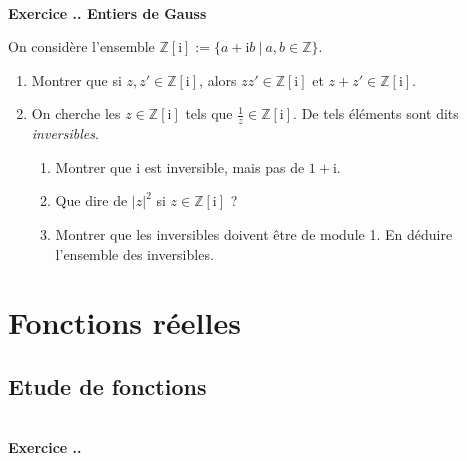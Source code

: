 \documentclass{article}
\newcommand{\mb}[1]{\mathbb{#1}}
\newcounter{exo}
\newcommand{\exercice}[1][\null]{\textbf{\\ Exercice \thesection.\theexo. #1} \addtocounter{exo}{1}}
\begin{document}
\exercice[Entiers de Gauss]

On considère l'ensemble $\mb{Z}[\text{i}] := \{a + \text{i}b~|~a, b \in \mb{Z}\}$.

\begin{enumerate}

\item Montrer que si $z, z' \in \mb{Z}[\text{i}]$, alors $zz' \in \mb{Z}[\text{i}]$ et $z+z' \in \mb{Z}[\text{i}]$.

\item On cherche les $z \in \mb{Z}[\text{i}] $ tels que $ \frac{1}{z} \in \mb{Z}[\text{i}]$. De tels éléments sont dits \emph{inversibles}.

\begin{enumerate}

\item Montrer que $\text{i}$ est inversible, mais pas de $1+ \text{i}$.

\item Que dire de $|z|^2$ si $z \in \mb{Z}[\text{i}]$ ?

\item Montrer que les inversibles doivent être de module 1. En déduire l'ensemble des inversibles.


\end{enumerate}


\end{enumerate}





\section{Fonctions réelles}

\subsection{Etude de fonctions}


\exercice 
\end{document}
